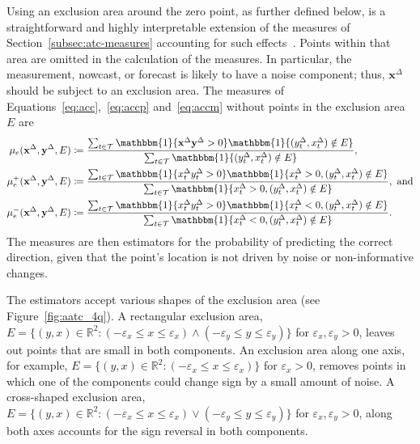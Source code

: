 \documentclass[pdflatex]{sn-jnl}
\theoremstyle{plain}%
\theoremstyle{definition}
\newcommand{\ind}[1]{\mathbbm{1}\{#1\}}
\newcommand{\R}{\mathbb{R}}
\newcommand{\diffx}{\mathbf{x}^{\Delta}}
\newcommand{\diffy}{\mathbf{y}^{\Delta}}
\newcommand{\diffxt}[1][t]{x^{\Delta}_{#1}}
\newcommand{\diffyt}[1][t]{y^{\Delta}_{#1}}
\newcommand{\acc}{\mu}
\newcommand{\acceps}[1][e]{\acc_{#1}} %
\newcommand{\accpeps}[1][e]{\acceps[#1]^+}
\newcommand{\accmeps}[1][e]{\acceps[#1]^-}
\begin{document}
Using an exclusion area around the zero point, as further defined below, is a straightforward and highly interpretable extension of the measures of Section~\ref{subsec:atc-measures} accounting for such effects~\citep[see, e.g.,][]{Saugel2015, Critchley2010}.
Points within that area are omitted in the calculation of the measures.
In particular, the measurement, nowcast, or forecast is likely to have a noise component; thus, $\diffx$ should be subject to an exclusion area.
The measures of Equations~\eqref{eq:acc},~\eqref{eq:accp} and~\eqref{eq:accm} without points in the exclusion area $E$ are
\begin{align}
    \acceps (\diffx, \diffy, E) &\coloneqq \frac{\sum_{t \in \mathcal{T}} \ind{\diffx \diffy > 0} \ind{(\diffyt, \diffxt) \notin E}}{\sum_{t \in \mathcal{T}} \ind{(\diffyt, \diffxt) \notin E}},\label{eq:acceps}\\
    \accpeps (\diffx, \diffy, E) &\coloneqq \frac{\sum_{t \in \mathcal{T}} \ind{\diffxt \diffyt > 0} \ind{\diffxt > 0, (\diffyt, \diffxt) \notin E}}{\sum_{t \in \mathcal{T}} \ind{\diffxt > 0, (\diffyt, \diffxt) \notin E}}, \ \text{and} \label{eq:accpeps}\\
    \accmeps (\diffx, \diffy, E) &\coloneqq \frac{\sum_{t \in \mathcal{T}} \ind{\diffxt \diffyt > 0} \ind{\diffxt < 0, (\diffyt, \diffxt) \notin E}}{\sum_{t \in \mathcal{T}} \ind{\diffxt < 0, (\diffyt, \diffxt) \notin E}}. \label{eq:accmeps}
\end{align}
The measures are then estimators for the probability of predicting the correct direction, given that the point's location is not driven by noise or non-informative changes.

The estimators accept various shapes of the exclusion area (see Figure~\ref{fig:aatc_4q}).
A rectangular exclusion area, $E = \{(y, x) \in \R^2: (-\varepsilon_x \leq x \leq \varepsilon_x) \land (-\varepsilon_y \leq y \leq \varepsilon_y) \}$ for $\varepsilon_x, \varepsilon_y > 0$, leaves out points that are small in both components.
An exclusion area along one axis, for example, $E = \{(y, x) \in \R^2: (-\varepsilon_x \leq x \leq \varepsilon_x)\}$ for $\varepsilon_x > 0$, removes points in which one of the components could change sign by a small amount of noise.
A cross-shaped exclusion area, $E = \{(y, x) \in \R^2: (-\varepsilon_x \leq x \leq \varepsilon_x) \lor (-\varepsilon_y \leq y \leq \varepsilon_y) \}$ for $\varepsilon_x, \varepsilon_y > 0$, along both axes accounts for the sign reversal in both components.
\end{document}
